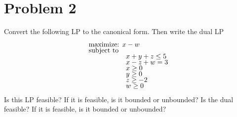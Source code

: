 \newpage
\section{Problem 2}
Convert the following LP to the canonical form. Then write the dual LP
\begin{align*}
    &\text{maximize: } x - w            \\[-1.5ex]
    &\text{subject to}                  \\[-1.5ex]
    & \hspace{19mm} x + y + z \leq 5    \\[-1.5ex]
    & \hspace{19mm} x - z + w = 3       \\[-1.5ex]
    & \hspace{19mm} x \geq 0            \\[-1.5ex]
    & \hspace{19mm} y \geq 0            \\[-1.5ex]
    & \hspace{19mm} z \geq -2           \\[-1.5ex]
    & \hspace{19mm} w \geq 0
\end{align*}
Is this LP feasible? If it is feasible, is it bounded or unbounded? Is the dual feasible? If it is feasible, is it bounded or unbounded?

\newpage
